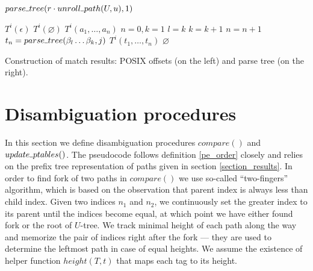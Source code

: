 \documentclass[AMA,STIX1COL]{WileyNJD-v2}
\newcommand{\Xund}{\rule{.4em}{.4pt}}
\begin{document}
\begin{algorithm}[H]
\begin{multicols}{2}
    \Fn {$\underline{f\!inal \Xund result (\Xund, U, u, r, \Xund)} \smallskip$} {
        \Return $parse \Xund tree (r \cdot unroll \Xund path (U, u), 1)$ \;
    }
    \BlankLine
    \BlankLine

    \Fn {$\underline{parse \Xund tree (u, i)} \smallskip$} {
         {
            \Return $T^i(\epsilon)$
        }
         {
            \Return $T^i(\varnothing)$
        }
         {
            \Return $T^i(a_1, \hdots, a_n)$
        }
         {
            $n = 0, k = 1$ \;
             {
                $l = k$ \;
                 {
                    $k = k + 1$
                }
                $n = n + 1$ \;
                $t_n = parse \Xund tree (\beta_l \dots \beta_k, j)$
            }
            \Return $T^i(t_1, \dots, t_n)$
        }
        \Return $\varnothing$ 
    }
    \BlankLine

    \vfill

\end{multicols}
\vspace{1.5em}
\caption{Construction of match results: POSIX offsets (on the left) and parse tree (on the right).}
\end{algorithm}
\medskip


\section{Disambiguation procedures}\label{section_comparison}

In this section we define disambiguation procedures $compare ()$ and $update \Xund ptables ()$.
The pseudocode follows definition \ref{pe_order} closely
and relies on the prefix tree representation of paths given in section \ref{section_results}.
%
In order to find fork of two paths in $compare ()$ we use so-called ``two-fingers'' algorithm,
which is based on the observation that parent index is always less than child index.
Given two indices $n_1$ and $n_2$, we continuously set the greater index to its parent until the indices become equal,
at which point we have either found fork or the root of $U$-tree.
We track minimal height of each path along the way
and memorize the pair of indices right after the fork --- they are used to determine the leftmost path in case of equal heights.
%
We assume the existence of helper function $height(T, t)$ that maps each tag to its height.
\\
\end{document}
